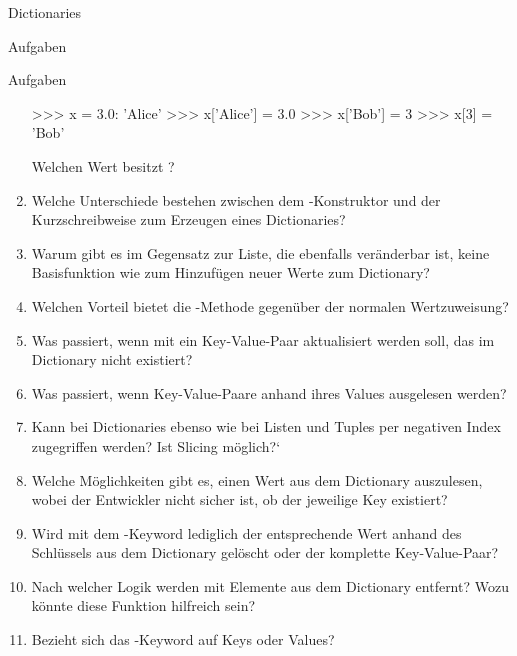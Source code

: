 \begin{subsection}{Dictionaries}
\begin{subsubsection}{Aufgaben}
\begin{frame}{Aufgaben}
\begin{enumerate}
\begin{pyconcode}
>>> x = {3.0: 'Alice'}
>>> x['Alice'] = 3.0
>>> x['Bob'] = 3
>>> x[3] = 'Bob'
\end{pyconcode} 
                Welchen Wert besitzt ?
                    \item Welche Unterschiede bestehen zwischen dem -Konstruktor und der Kurzschreibweise \code{[]} zum Erzeugen eines Dictionaries?
                    
                    \item Warum gibt es im Gegensatz zur Liste, die ebenfalls veränderbar ist, keine Basisfunktion wie  zum Hinzufügen neuer Werte zum Dictionary?
                    
                    \item Welchen Vorteil bietet die -Methode gegenüber der normalen Wertzuweisung?
                    
                    \item Was passiert, wenn mit  ein Key-Value-Paar aktualisiert werden soll, das im Dictionary nicht existiert?
                    
                    \item Was passiert, wenn Key-Value-Paare anhand ihres Values ausgelesen werden?
                    
                    \item Kann bei Dictionaries ebenso wie bei Listen und Tuples per negativen Index zugegriffen werden? Ist Slicing möglich?`
                    
                    \item Welche Möglichkeiten gibt es, einen Wert aus dem Dictionary auszulesen, wobei der Entwickler nicht sicher ist, ob der jeweilige Key existiert?
                    
                    \item Wird mit dem -Keyword lediglich der entsprechende Wert anhand des Schlüssels aus dem Dictionary gelöscht oder der komplette Key-Value-Paar?
                    
                    \item Nach welcher Logik werden mit  Elemente aus dem Dictionary entfernt? Wozu könnte diese Funktion hilfreich sein?
                    
                    \item Bezieht sich das -Keyword auf Keys oder Values?
                    

\end{enumerate}
\end{frame}
\end{subsubsection}
\end{subsection}
